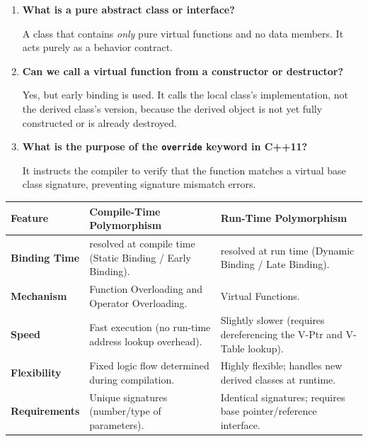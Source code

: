 \documentclass[12pt,a4paper]{article}
\newcommand{\Q}[1]{\textbf{#1}\par\noindent\ignorespaces}
\renewcommand{\arraystretch}{1.45}
\begin{document}
\begin{tcolorbox}[exambox, title={\textbf{Frequently Asked / Viva Questions}}]
\begin{enumerate}[topsep=0pt, label=\textbf{Q\arabic*.}, itemsep=5pt]
  \item \Q{What is a pure abstract class or interface?}
    A class that contains \textit{only} pure virtual functions and no data members. It acts purely as a behavior contract.
  \item \Q{Can we call a virtual function from a constructor or destructor?}
    Yes, but early binding is used. It calls the local class's implementation, not the derived class's version, because the derived object is not yet fully constructed or is already destroyed.
  \item \Q{What is the purpose of the \texttt{override} keyword in C++11?}
    It instructs the compiler to verify that the function matches a virtual base class signature, preventing signature mismatch errors.
\end{enumerate}
\end{tcolorbox}

\begin{tcolorbox}[tikzbox, title={Comparison: Compile-Time vs. Run-Time Polymorphism}]
\renewcommand{\arraystretch}{1.45}
\par\noindent
\begin{tabularx}{\linewidth}{|B{3.2cm}|Y|Y|}
\hline
\textbf{Feature} & \textbf{\color{myteal}Compile-Time Polymorphism} & \textbf{\color{myamber}Run-Time Polymorphism} \\
\hline
\textbf{Binding Time} & resolved at compile time (Static Binding / Early Binding). & resolved at run time (Dynamic Binding / Late Binding). \\
\hline
\textbf{Mechanism} & Function Overloading and Operator Overloading. & Virtual Functions. \\
\hline
\textbf{Speed} & Fast execution (no run-time address lookup overhead). & Slightly slower (requires dereferencing the V-Ptr and V-Table lookup). \\
\hline
\textbf{Flexibility} & Fixed logic flow determined during compilation. & Highly flexible; handles new derived classes at runtime. \\
\hline
\textbf{Requirements} & Unique signatures (number/type of parameters). & Identical signatures; requires base pointer/reference interface. \\
\hline
\end{tabularx}
\end{tcolorbox}
\end{document}
